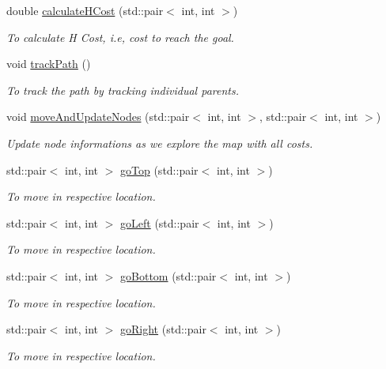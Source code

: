\begin{DoxyCompactItemize}
double \hyperlink{classoptimalPlanner_a2ca65cc3a34ea39614c0da1fb4ab1189}{calculate\+H\+Cost} (std\+::pair$<$ int, int $>$)
\begin{DoxyCompactList}\small\item\em To calculate H Cost, i.\+e, cost to reach the goal. \end{DoxyCompactList}\item 
void \hyperlink{classoptimalPlanner_a9a6892e6beceed5ca588d1bf46b7d40b}{track\+Path} ()
\begin{DoxyCompactList}\small\item\em To track the path by tracking individual parents. \end{DoxyCompactList}\item 
void \hyperlink{classoptimalPlanner_a5f886dd1ad67dd6a8f0d747c316830e2}{move\+And\+Update\+Nodes} (std\+::pair$<$ int, int $>$, std\+::pair$<$ int, int $>$)
\begin{DoxyCompactList}\small\item\em Update node informations as we explore the map with all costs. \end{DoxyCompactList}\item 
std\+::pair$<$ int, int $>$ \hyperlink{classoptimalPlanner_a99a4e25f991be60cacc9dd74af0a41b8}{go\+Top} (std\+::pair$<$ int, int $>$)
\begin{DoxyCompactList}\small\item\em To move in respective location. \end{DoxyCompactList}\item 
std\+::pair$<$ int, int $>$ \hyperlink{classoptimalPlanner_ae846f7b527b1aeedada33c12bf620ccb}{go\+Left} (std\+::pair$<$ int, int $>$)
\begin{DoxyCompactList}\small\item\em To move in respective location. \end{DoxyCompactList}\item 
std\+::pair$<$ int, int $>$ \hyperlink{classoptimalPlanner_a921f457476a499fabdc4796057b7b47f}{go\+Bottom} (std\+::pair$<$ int, int $>$)
\begin{DoxyCompactList}\small\item\em To move in respective location. \end{DoxyCompactList}\item 
std\+::pair$<$ int, int $>$ \hyperlink{classoptimalPlanner_af1d87157d27807b2276c2e4a7536c12e}{go\+Right} (std\+::pair$<$ int, int $>$)
\begin{DoxyCompactList}\small\item\em To move in respective location. \end{DoxyCompactList}\end{DoxyCompactItemize}



